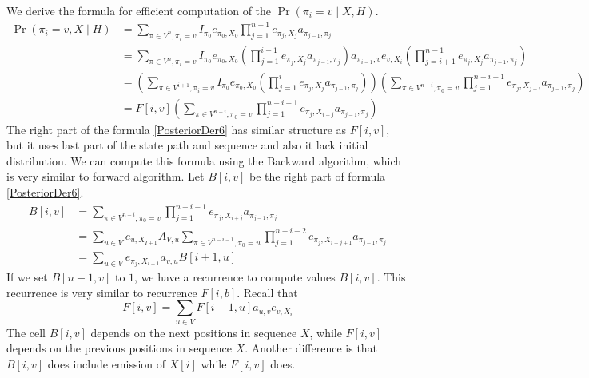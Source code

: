 We derive the formula for efficient computation of the  $\Pr\left(\pi_i=v\mid
X,H\right)$.
\begin{align}
\Pr\left(\pi_i=v,X\mid H\right) &=  
				\sum_{\pi\in
				V^n,\pi_i=v}I_{\pi_0}e_{\pi_0,X_0}\prod_{j=1}^{n-1}e_{\pi_j,X_j}a_{\pi_{j-1},\pi_j}
					\label{PosteriorDer2}\\
				&= \sum_{\pi\in V^n,\pi_i=v}I_{\pi_0}e_{\pi_0,X_0}
				\left( 
					\prod_{j=1}^{i-1} e_{\pi_j,X_j}a_{\pi_{j-1},\pi_j}
				\right)
				a_{\pi_{i-1},v}e_{v,X_i}
				\left(  
					\prod_{j=i+1}^{n-1} e_{\pi_j,X_j}a_{\pi_{j-1},\pi_j}
				\right)
					\label{PosteriorDer4}\\
				&= 
				\left(
					\sum_{\pi\in V^{i+1},\pi_i=v}I_{\pi_0}e_{\pi_0,X_0}
					\left(
						\prod_{j=1}^{i} e_{\pi_j,X_j}a_{\pi_{j-1},\pi_j}
					\right)
				\right)
				\left( 
					\sum_{\pi\in V^{n-i},\pi_0=v}
					\prod_{j=1}^{n-i-1} e_{\pi_j,X_{j+i}}a_{\pi_{j-1},\pi_j}
				\right)
					\label{PosteriorDer5}\\
				&= F[i,v]
				\left( 
					\sum_{\pi\in V^{n-i},\pi_0=v}
					\prod_{j=1}^{n-i-1} e_{\pi_j,X_{i+j}}a_{\pi_{j-1},\pi_j}
				\right)
					\label{PosteriorDer6}
\end{align}
The right part of the formula \ref{PosteriorDer6} has
similar structure as $F[i,v]$, but it uses last part of the state path and
sequence and also it lack initial distribution. We can compute 
this formula using  the Backward algorithm, which is very similar to forward
algorithm. Let $B[i,v]$ be the right part of formula \ref{PosteriorDer6}.
\begin{align}
B[i,v]&=
\sum_{\pi\in V^{n-i},\pi_0=v}
	\prod_{j=1}^{n-i-1}
		e_{\pi_j,X_{i+j}}a_{\pi_{j-1},\pi_j}\\
 &= 
 \sum_{u\in V}
 	e_{u,X_{I+1}}A_{V,u}
	\sum_{\pi\in V^{n-i-1},\pi_0=u}
		\prod_{j=1}^{n-i-2}
			e_{\pi_j,X_{i+j+1}}a_{\pi_{j-1},\pi_j}\\
 &= 
 \sum_{u\in V}
 	e_{\pi_j,X_{i+1}}a_{v,u}B[i+1,u]
\end{align}
If we set $B[n-1,v]$ to $1$, we have a recurrence to compute values
$B[i,v]$. This recurrence is very similar to recurrence $F[i,b]$. Recall that
\[F[i,v] = \sum_{u\in V}F[i-1,u] a_{u,v} e_{v,X_i}\]
The cell $B[i,v]$ depends on the next positions in sequence $X$,
while $F[i,v]$ depends on the previous positions in sequence $X$. Another
difference is that $B[i,v]$ does include emission of $X[i]$ while $F[i,v]$ does.

